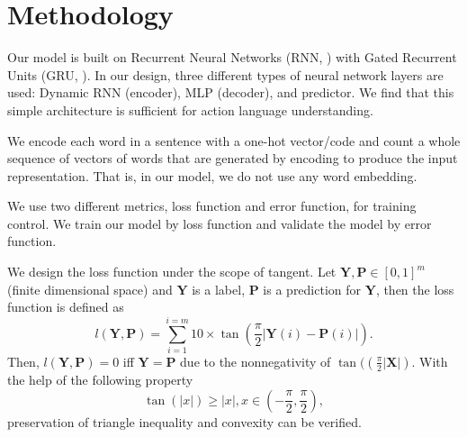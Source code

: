 \documentclass[letterpaper]{article}
\newcommand{\citealp}[1]{\citeauthor{#1} \citeyear{#1}}
\begin{document}
\section*{Methodology}
Our model is built on  Recurrent Neural Networks (RNN, \citealp{graves2006connectionist}) with Gated Recurrent Units (GRU, \citealp{cho2014emnlp}). In our design, three different types of neural network layers are used: Dynamic RNN (encoder), MLP (decoder), and predictor. We find that this simple architecture is sufficient for action language understanding.

We encode each word in a sentence with a one-hot vector/code \cite{hinton1984distributed} and count a whole sequence of vectors of words that are generated by encoding to produce the input representation. That is, in our model, we do not use any word embedding.

We use two different metrics, loss function and error function, for training control. We train our model by loss function and validate the model by error function.

We design the loss function under the scope of tangent. Let $\mathbf{Y},\mathbf{P}\in[0,1]^m$ (finite dimensional space) and $\mathbf{Y}$ is a label, $\mathbf{P}$ is a prediction for $\mathbf{Y}$, then the loss function is defined as
\begin{equation} l(\mathbf{Y},\mathbf{P})=\sum_{i=1}^{i=m}10\times\tan(\frac{\pi}{2}|\mathbf{Y}(i)- \mathbf{P}(i)|).
\end{equation}
Then, $l(\mathbf{Y},\mathbf{P})=0$ iff $\mathbf{Y}=\mathbf{P}$ due to the nonnegativity of $\tan((\frac{\pi}{2}|\mathbf{X}|)$. With the help of the following property
\begin{equation}
\tan(|x|)\ge|x|,x\in(-\frac{\pi}{2},\frac{\pi}{2}),
\end{equation}
preservation of triangle inequality and convexity can be verified.
\end{document}
